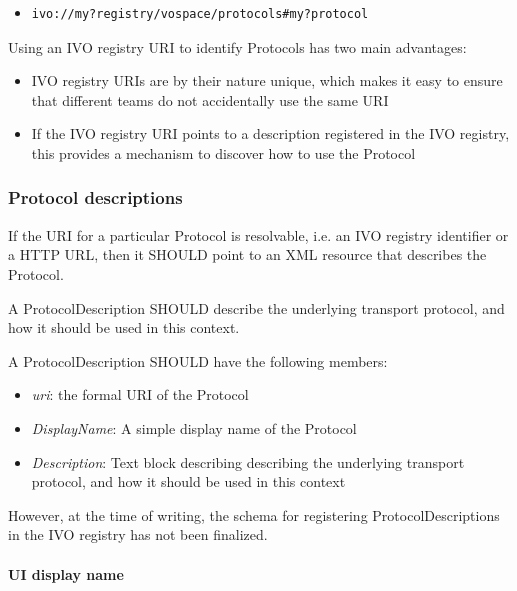 \documentclass[11pt,a4paper]{ivoa}
\begin{document}
\begin{itemize}
    \item \begin{verbatim}ivo://my?registry/vospace/protocols#my?protocol\end{verbatim}
\end{itemize}

Using an IVO registry URI to identify Protocols has two main advantages:

\begin{itemize}
    \item IVO registry URIs are by their nature unique, which makes it easy to ensure that different teams do not accidentally use the same URI
    \item If the IVO registry URI points to a description registered in the IVO registry, this provides a mechanism to discover how to use the Protocol
\end{itemize}

\subsubsection{Protocol descriptions}
\label{subsubsec:protocol descriptions}
If the URI for a particular Protocol is resolvable, i.e. an IVO registry identifier or a HTTP URL, then it SHOULD point to an XML resource that describes the Protocol.

A ProtocolDescription SHOULD describe the underlying transport protocol, and how it should be used in this context.

A ProtocolDescription SHOULD have the following members:

\begin{itemize}
    \item \emph{uri}: the formal URI of the Protocol
    \item \emph{DisplayName}: A simple display name of the Protocol
    \item \emph{Description}: Text block describing describing the underlying transport protocol, and how it should be used in this context
\end{itemize}

However, at the time of writing, the schema for registering ProtocolDescriptions in the IVO registry has not been finalized.

\paragraph{UI display name}
\end{document}
